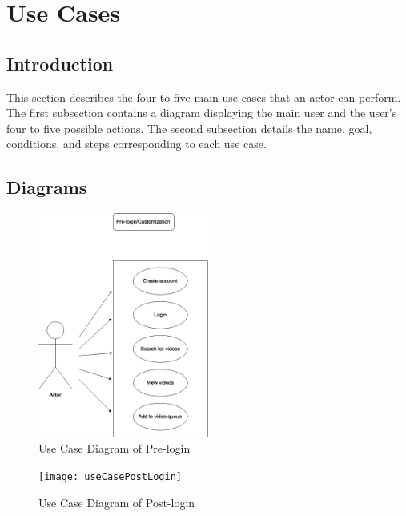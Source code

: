 \chapter{Use Cases}

\section{Introduction}
This section describes the four to five main use cases that an actor can perform. The first subsection contains a diagram displaying the main user and the user's four to five possible actions. The second subsection details the name, goal, conditions, and steps corresponding to each use case. 

\section{Diagrams}
\begin{figure}[!ht]
      \centering
      \includegraphics[width=0.5\textwidth]{useCasePreLogin}
      \caption{Use Case Diagram of Pre-login}	
\end{figure}
\begin{figure}[!ht]
      \centering
      \texttt{[image: useCasePostLogin]}
      \caption{Use Case Diagram of Post-login}	
\end{figure}


